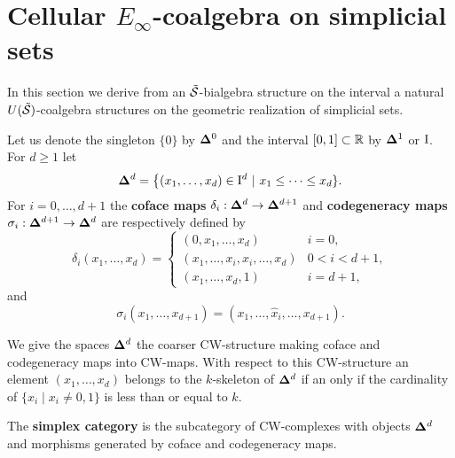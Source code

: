 \section{Cellular $E_\infty$-coalgebra on simplicial sets}

In this section we derive from an $\tilde{\S}$-bialgebra structure on the interval a natural \mbox{$U(\tilde{\S})$-coalgebra} structures on the geometric realization of simplicial sets.

\begin{definition} \label{definition: simplex category}
	Let us denote the singleton $\{0\}$ by $\simplex^0$ and the interval $[0,1] \subset \R$ by $\simplex^1$ or $\I$. For $d \geq 1$ let  
	\begin{equation*}
	\simplex^d = \big\{ (x_1, \dots, x_d) \in \I^d\ | \ x_1 \leq \cdots \leq x_d \}.
	\end{equation*}
	For $i = 0,\dots,d+1$ the \textbf{coface maps} $\delta_i:\simplex^{d} \to \simplex^{d+1}$ and \textbf{codegeneracy maps} $\sigma_i : \simplex^{d+1} \to \simplex^{d}$ are respectively defined by
	\begin{equation*}
	\delta_i(x_1, \dots, x_d) = 
	\begin{cases}
	(0,x_1, \dots, x_d)    & i = 0, \\
	(x_1, \dots, x_i, x_i, \dots, x_d)    & 0 < i < d+1, \\
	(x_1, \dots, x_d, 1)    & i = d+1,
	\end{cases}
	\end{equation*}
	and
	\begin{equation*}
	\sigma_i(x_1, \dots, x_{d+1}) = (x_1, \dots, \widehat{x}_i, \dots, x_{d+1}).
	\end{equation*}
	
	We give the spaces $\simplex^d$ the coarser CW-structure making coface and codegeneracy maps into CW-maps. With respect to this CW-structure an element $(x_1,\dots,x_d)$ belongs to the $k$-skeleton of $\simplex^d$ if an only if the cardinality of $\{x_i\; |\; x_i \neq 0,1\}$ is less than or equal to $k$.
	
	The \textbf{simplex category} is the subcategory of CW-complexes with objects $\simplex^d$ and morphisms generated by coface and codegeneracy maps.
\end{definition}

